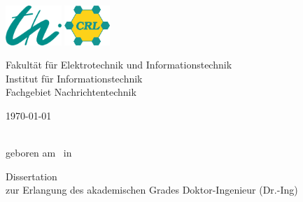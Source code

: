 \begin{titlepage}
    \pagestyle{empty}
    \centering \rmfamily \large

    \includegraphics[height=1.5cm]{./_template/tui_logos/logo_tui.eps}
    \hfill
    \hfill
    \includegraphics[height=1.5cm]{./_template/tui_logos/logo_crl.eps}
    
    { \onehalfspacing
    Fakult\"{a}t f\"{u}r Elektrotechnik und Informationstechnik\\ %
    Institut f\"{u}r Informationstechnik \\ %
    Fachgebiet Nachrichtentechnik\\ %
    }
    
    \vspace{1.5cm}
    
    {\Huge \scshape \bfseries \singlespacing \phdtitle \par}
    
    \vspace{1.0cm}
    
    \today
    
    \vspace{1.0cm}
    
    {\Large \slshape \authorname}\\
    {geboren am \dateofbirth ~in \placeofbirth}
    
    \vspace{1.0cm}
    
    {\Large Dissertation}\\ 
    {\large zur Erlangung des akademischen Grades Doktor-Ingenieur (Dr.-Ing)}
    
    \vfill
    

\end{titlepage}
